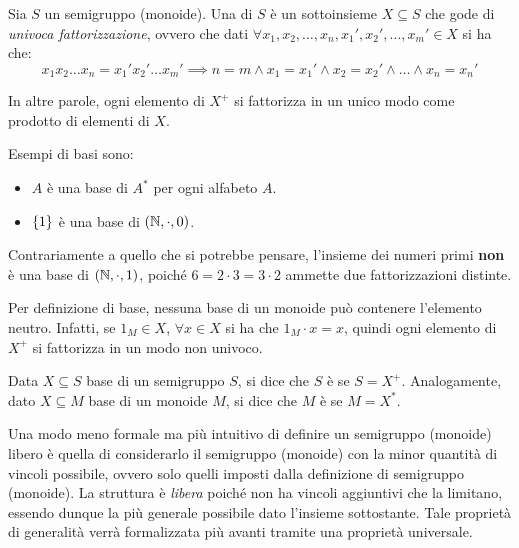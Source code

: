\begin{definition}
  Sia \(S\) un semigruppo (monoide).
  Una  di \(S\) è un sottoinsieme \(X \subseteq S\) che gode di \emph{univoca fattorizzazione}, ovvero che dati \(\forall x_1,x_2,\ldots,x_n,x_1',x_2',\ldots,x_m' \in X\) si ha che:
  \[x_1 x_2 \ldots x_n = x_1' x_2' \ldots x_m' \implies n=m \land x_1 = x_1' \land x_2 = x_2' \land \ldots \land x_n = x_n'\]
\end{definition}
In altre parole, ogni elemento di \(X^{+}\) si fattorizza in un unico modo come prodotto di elementi di \(X\).

\begin{example}
  Esempi di basi sono:
  \begin{itemize}
    \item \(A\) è una base di \(A^*\) per ogni alfabeto \(A\).
    \item \(\set{1}\) è una base di \((\mathbb{N}, \cdot, 0)\).
  \end{itemize}
  Contrariamente a quello che si potrebbe pensare, l'insieme dei numeri primi \textbf{non} è una base di \((\mathbb{N}, \cdot, 1)\), poiché \(6 = 2 \cdot 3 = 3 \cdot 2\) ammette due fattorizzazioni distinte.
\end{example}

\begin{note}
  Per definizione di base, nessuna base di un monoide può contenere l'elemento neutro.
  Infatti, se \(1_M \in X\), \(\forall x \in X\) si ha che \(1_M \cdot x = x\), quindi ogni elemento di \(X^{+}\) si fattorizza in un modo non univoco.
\end{note}

\begin{definition}
  Data \(X \subseteq S\) base di un semigruppo \(S\), si dice che \(S\) è  se \(S = X^{+}\).
  Analogamente, dato \(X \subseteq M\) base di un monoide \(M\), si dice che \(M\) è  se \(M = X^{*}\).
\end{definition}
Una modo meno formale ma più intuitivo di definire un semigruppo (monoide) libero è quella di considerarlo il semigruppo (monoide) con la minor quantità di vincoli possibile, ovvero solo quelli imposti dalla definizione di semigruppo (monoide).
La struttura è \emph{libera} poiché non ha vincoli aggiuntivi che la limitano, essendo dunque la più generale possibile dato l'insieme sottostante.
Tale proprietà di generalità verrà formalizzata più avanti tramite una proprietà universale.


